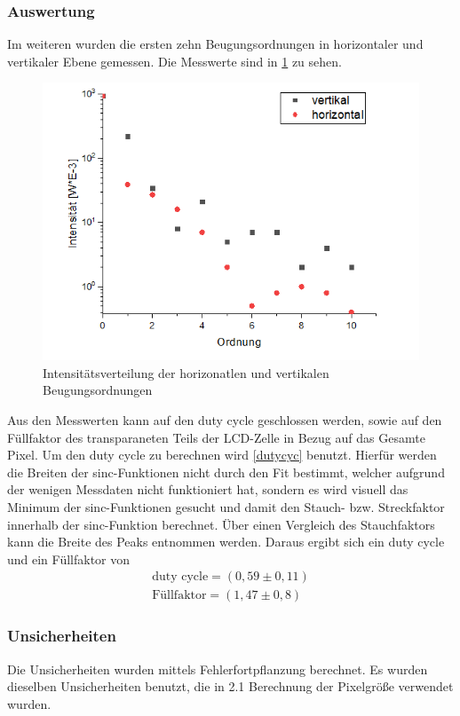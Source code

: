 \subsubsection{Auswertung}
Im weiteren wurden die ersten zehn Beugungsordnungen in horizontaler und vertikaler Ebene gemessen. Die Messwerte sind in \cref{horiz} zu sehen.
\begin{figure}[h!]
	\centering
	\includegraphics[scale = 1]{horizundvertik.png}
	\caption{Intensitätsverteilung der horizonatlen und vertikalen Beugungsordnungen}
	\label{horiz}
\end{figure}
Aus den Messwerten kann auf den duty cycle geschlossen werden, sowie auf den Füllfaktor des transparaneten Teils der LCD-Zelle in Bezug auf das Gesamte Pixel. Um den duty cycle zu berechnen wird \cref{dutycyc} benutzt. Hierfür werden die Breiten der sinc-Funktionen nicht durch den Fit bestimmt, welcher aufgrund der wenigen Messdaten nicht funktioniert hat, sondern es wird visuell das Minimum der sinc-Funktionen gesucht und damit den Stauch- bzw. Streckfaktor innerhalb der sinc-Funktion berechnet. Über einen Vergleich des Stauchfaktors kann die Breite des Peaks entnommen werden.
Daraus ergibt sich ein duty cycle und ein Füllfaktor von 
\begin{align}
	\text{duty cycle} = (0,59 \pm 0,11) \\
	\text{Füllfaktor} = (1,47 \pm 0,8)
\end{align}
\subsubsection{Unsicherheiten}
Die Unsicherheiten wurden mittels Fehlerfortpflanzung berechnet. Es wurden dieselben Unsicherheiten benutzt, die in 2.1 Berechnung der Pixelgröße verwendet wurden.
